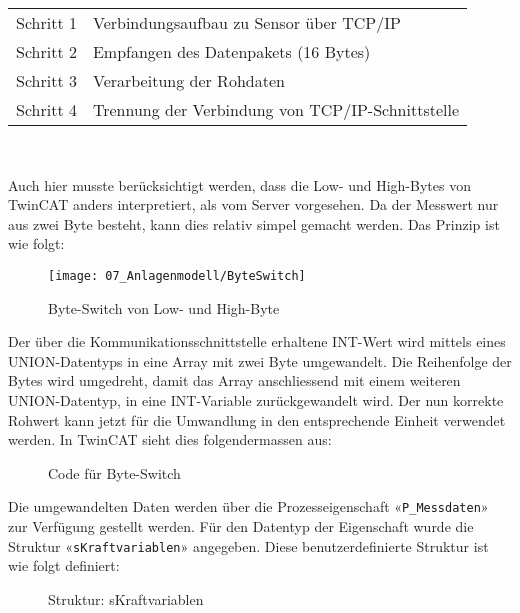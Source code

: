 		\begin{tabularx}{\textwidth}{@{}>{}p{8em} X@{}}
			Schritt 1 & 
			Verbindungsaufbau zu Sensor über TCP/IP
			\\
			Schritt 2 & 
			Empfangen des Datenpakets (16 Bytes)
			\\
			Schritt 3 & 
			Verarbeitung der Rohdaten   
			\\
			Schritt 4 & 
			Trennung der Verbindung von TCP/IP-Schnittstelle
			\\
		\end{tabularx}
		\\
		\newpage
		
		Auch hier musste berücksichtigt werden, dass die Low- und High-Bytes von TwinCAT anders interpretiert, als vom Server vorgesehen. Da der Messwert nur aus zwei Byte besteht, kann dies relativ simpel gemacht werden. Das Prinzip ist wie folgt:
		
		\begin{figure}[h!]
			\centering
			\texttt{[image: 07\_Anlagenmodell/ByteSwitch]}
			\caption{Byte-Switch von Low- und High-Byte}
			\label{fig:ByteSwitch}
		\end{figure} 
		
		Der über die Kommunikationsschnittstelle erhaltene INT-Wert wird mittels eines UNION-Datentyps in eine Array mit zwei Byte umgewandelt. Die Reihenfolge der Bytes wird umgedreht, damit das Array anschliessend mit einem weiteren UNION-Datentyp, in eine INT-Variable zurückgewandelt wird. Der nun korrekte Rohwert kann jetzt für die Umwandlung in den entsprechende Einheit verwendet werden.  In TwinCAT sieht dies folgendermassen aus: 
		
		\begin{figure}[h!]
			\centering
			\captionsetup{justification=centering}
			\caption{Code für Byte-Switch}
			\label{fig:ByteSwitchCode}
		\end{figure} 
		
		Die umgewandelten Daten werden über die Prozesseigenschaft «\verb|P_Messdaten|» zur Verfügung gestellt werden. Für den Datentyp der Eigenschaft wurde die Struktur «\verb|sKraftvariablen|» angegeben. Diese benutzerdefinierte Struktur ist wie folgt definiert: 
		
		\begin{figure}[h!]
			\centering
			\captionsetup{justification=centering}
			\caption{Struktur: sKraftvariablen}
			\label{fig:sKraftvariablen}
		\end{figure} 
		
